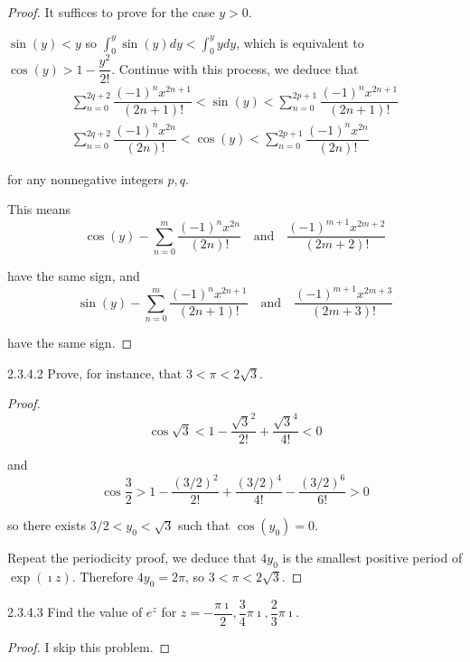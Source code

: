 \begin{proof}
	It suffices to prove for the case \( y > 0 \).

	\( \sin(y) < y \) so \( \int_{0}^{y} \sin(y) dy < \int_{0}^{y} y dy \), which is equivalent to \( \cos(y) > 1 - \dfrac{y^{2}}{2!} \). Continue with this process, we deduce that
	\[
		\begin{split}
			\sum_{n=0}^{2q + 2} \dfrac{{(-1)}^{n} x^{2n+1}}{(2n+1)!} < \sin(y) < \sum_{n=0}^{2p + 1} \dfrac{{(-1)}^{n} x^{2n+1}}{(2n+1)!} \\
			\sum_{n=0}^{2q + 2} \dfrac{{(-1)}^{n} x^{2n}}{(2n)!} < \cos(y) < \sum_{n=0}^{2p+1} \dfrac{{(-1)}^{n} x^{2n}}{(2n)!}
		\end{split}
	\]

	for any nonnegative integers \( p, q \).

	This means
	\[
		\cos(y) - \sum_{n=0}^{m} \dfrac{{(-1)}^{n} x^{2n}}{(2n)!} \quad \text{and} \quad \dfrac{{(-1)}^{m+1}x^{2m+2}}{(2m + 2)!}
	\]

	have the same sign, and
	\[
		\sin(y) - \sum_{n=0}^{m} \dfrac{{(-1)}^{n} x^{2n+1}}{(2n+1)!} \quad \text{and} \quad \dfrac{{(-1)}^{m+1}x^{2m+3}}{(2m+3)!}
	\]

	have the same sign.
\end{proof}

\begin{problem}{2.3.4.2}
Prove, for instance, that \( 3 < \pi < 2\sqrt{3} \).
\end{problem}

\begin{proof}
	\[
		\cos\sqrt{3} < 1 - \dfrac{\sqrt{3}^{2}}{2!} + \dfrac{\sqrt{3}^{4}}{4!} < 0
	\]

	and
	\[
		\cos\dfrac{3}{2} > 1 - \dfrac{{(3/2)}^{2}}{2!} + \dfrac{{(3/2)}^{4}}{4!} - \dfrac{{(3/2)}^{6}}{6!} > 0
	\]

	so there exists \( 3/2 < y_{0} < \sqrt{3} \) such that \( \cos(y_{0}) = 0 \).

	Repeat the periodicity proof, we deduce that \( 4y_{0} \) is the smallest positive period of \( \exp(\imath z) \). Therefore \( 4y_{0} = 2\pi \), so \( 3 < \pi < 2\sqrt{3} \).
\end{proof}

\begin{problem}{2.3.4.3}
Find the value of \( e^{z} \) for \( z = -\dfrac{\pi \imath}{2}, \dfrac{3}{4}\pi \imath, \dfrac{2}{3}\pi \imath \).
\end{problem}

\begin{proof}
	I skip this problem.
\end{proof}

